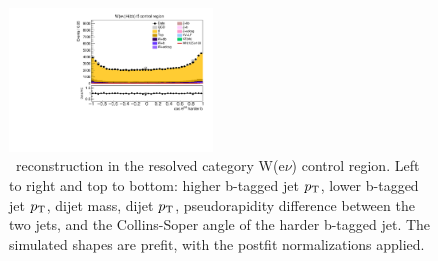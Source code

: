 \begin{figure}[tbp]
\begin{center}
    \includegraphics[width=0.48\textwidth]{figures/wlnhbb2016/resolved/WenWH2TopCR_hbbCosThetaCSJ1.pdf}
    \caption{\HBB\ reconstruction in the resolved category W(e$\nu$) \ttbar control region.
    Left to right and top to bottom: higher b-tagged jet $p_{\mathrm{T}}$, lower b-tagged jet $p_{\mathrm{T}}$, dijet mass, dijet $p_{\mathrm{T}}$, 
    pseudorapidity difference between the two jets, and the Collins-Soper angle of the harder b-tagged jet.
    The simulated shapes are prefit, with the postfit normalizations applied.}
    \label{fig:res_WenTT_Hbb}
  \end{center}
\end{figure}
\clearpage

